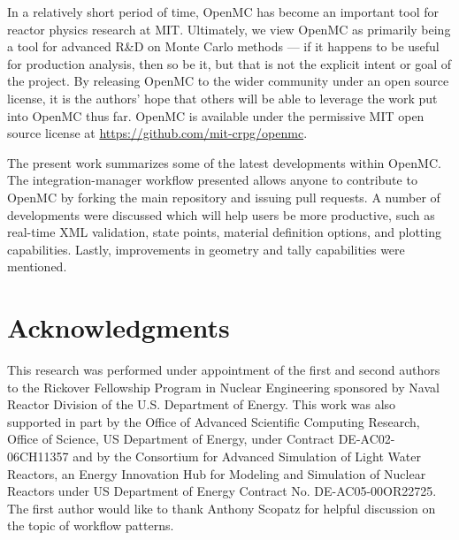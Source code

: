 \documentclass{ansconf}
\begin{document}
In a relatively short period of time, OpenMC has become an important tool for
reactor physics research at MIT. Ultimately, we view OpenMC as primarily being a
tool for advanced R\&D on Monte Carlo methods --- if it happens to be useful for
production analysis, then so be it, but that is not the explicit intent or goal
of the project. By releasing OpenMC to the wider community under an open source
license, it is the authors' hope that others will be able to leverage the work
put into OpenMC thus far. OpenMC is available under the permissive MIT open
source license at \url{https://github.com/mit-crpg/openmc}.

The present work summarizes some of the latest developments within OpenMC. The
integration-manager workflow presented allows anyone to contribute to OpenMC by
forking the main repository and issuing pull requests. A number of developments
were discussed which will help users be more productive, such as real-time XML
validation, state points, material definition options, and plotting
capabilities. Lastly, improvements in geometry and tally capabilities were
mentioned.

\section*{Acknowledgments}

This research was performed under appointment of the first and second authors to
the Rickover Fellowship Program in Nuclear Engineering sponsored by Naval
Reactor Division of the U.S. Department of Energy. This work was also supported
in part by the Office of Advanced Scientific Computing Research, Office of
Science, US Department of Energy, under Contract DE-AC02-06CH11357 and by the
Consortium for Advanced Simulation of Light Water Reactors, an Energy Innovation
Hub for Modeling and Simulation of Nuclear Reactors under US Department of
Energy Contract No. DE-AC05-00OR22725. The first author would like to thank
Anthony Scopatz for helpful discussion on the topic of workflow patterns.

\setlength{\baselineskip}{12pt}



\end{document}
